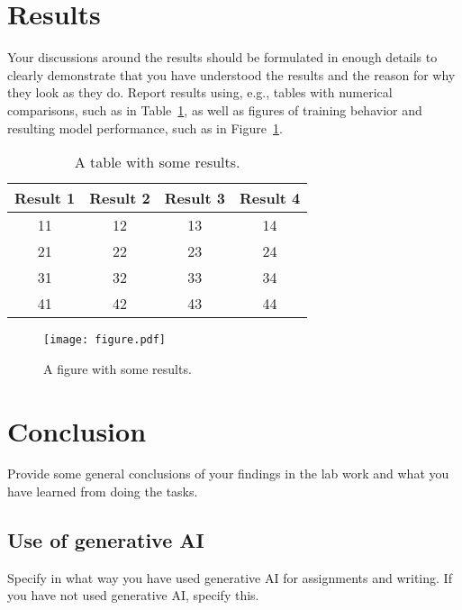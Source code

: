 \documentclass[a4paper]{article}
\newcommand{\figref}[1]{Figure~\ref{fig:#1}}
\newcommand{\tabref}[1]{Table~\ref{tab:#1}}
\begin{document}
\section{Results}\label{sec:results}
Your discussions around the results should be formulated in enough details to clearly demonstrate that you have understood the results and the reason for why they look as they do. Report results using, e.g., tables with numerical comparisons, such as in \tabref{table}, as well as figures of training behavior and resulting model performance, such as in \figref{figure}.

\begin{table}[t]
\centering
\begin{tabular}{|c c c c|} 
 \hline
 Result 1 & Result 2 & Result 3 & Result 4 \\
 \hline\hline
 11 & 12 & 13 & 14 \\ 
 \hline
 21 & 22 & 23 & 24 \\
 \hline
 31 & 32 & 33 & 34 \\
 \hline
 41 & 42 & 43 & 44 \\
 \hline
\end{tabular}
\caption{A table with some results.}
\label{tab:table}
\end{table}

\begin{figure}[t]
	\centering
	\texttt{[image: figure.pdf]}
	\caption{A figure with some results.}
	\label{fig:figure}
\end{figure}

\section{Conclusion}\label{sec:conclusions}
Provide some general conclusions of your findings in the lab work and what you have learned from doing the tasks.

\subsection*{Use of generative AI}
Specify in what way you have used generative AI for assignments and writing. If you have not used generative AI, specify this.



\end{document}
